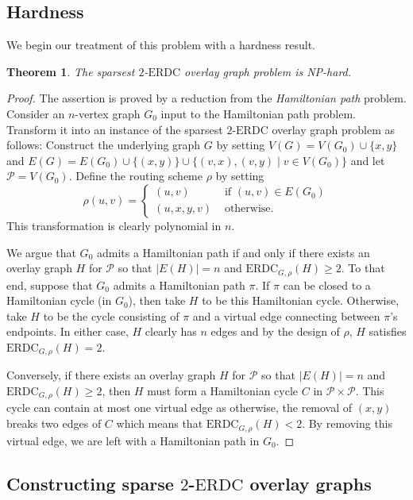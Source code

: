 \LongVersion \documentclass[11pt]{article}
\newtheorem{theorem}{Theorem}[section]
\theoremstyle{definition}
\theoremstyle{plain}
\newcommand{\Vertices}[0]{\mathit{V}}
\newcommand{\Edges}[0]{\mathit{E}}
\newcommand{\Peers}[0]{\mathcal{P}}
\newcommand{\ERDC}[0]{\mathrm{ERDC}}
\begin{document}
\subsection{Hardness}


We begin our treatment of this problem with a hardness result.

\begin{theorem} \label{theorem:HardnessSparsestERDC}
The sparsest $2$-$\ERDC$ overlay graph problem is NP-hard.
\end{theorem}
\begin{proof}
The assertion is proved by a reduction from the \emph{Hamiltonian path}
problem.
Consider an $n$-vertex graph $G_0$ input to the Hamiltonian path problem.
Transform it into an instance of the sparsest $2$-$\ERDC$ overlay graph
problem as follows:
Construct the underlying graph $G$ by setting $\Vertices(G) = \Vertices(G_0)
\cup \{x, y\}$ and $\Edges(G) = \Edges(G_0) \cup \{(x, y)\} \cup \{ (v, x),
(v, y) \mid v \in \Vertices(G_0) \}$ and let $\Peers = \Vertices(G_0)$.
Define the routing scheme $\rho$ by setting
$$
\rho(u, v) =
\left\{
\begin{array}{ll}
(u, v) & \text{ if } (u, v) \in \Edges(G_0) \\
(u, x, y, v) & \text{ otherwise.}
\end{array}
\right.
$$
This transformation is clearly polynomial in $n$.

We argue that $G_0$ admits a Hamiltonian path if and only if there exists an
overlay graph $H$ for $\Peers$ so that $|\Edges(H)| = n$ and $\ERDC_{G,
\rho}(H) \geq 2$.
To that end, suppose that $G_0$ admits a Hamiltonian path $\pi$.
If $\pi$ can be closed to a Hamiltonian cycle (in $G_0$), then take $H$ to be
this Hamiltonian cycle.
Otherwise, take $H$ to be the cycle consisting of $\pi$ and a virtual edge
connecting between $\pi$'s endpoints.
In either case, $H$ clearly has $n$ edges and by the design of
$\rho$, $H$ satisfies $\ERDC_{G, \rho}(H) = 2$.

Conversely, if there exists an overlay graph $H$ for $\Peers$ so that
$|\Edges(H)| = n$ and $\ERDC_{G, \rho}(H) \geq 2$, then $H$ must form a
Hamiltonian cycle $C$ in $\Peers \times \Peers$.
This cycle can contain at most one virtual edge as otherwise, the removal of
$(x, y)$ breaks two edges of $C$ which means that $\ERDC_{G, \rho}(H) < 2$.
By removing this virtual edge, we are left with a Hamiltonian path in $G_0$.
\end{proof}

\subsection{Constructing sparse $2$-$\ERDC$ overlay graphs}
\end{document}
